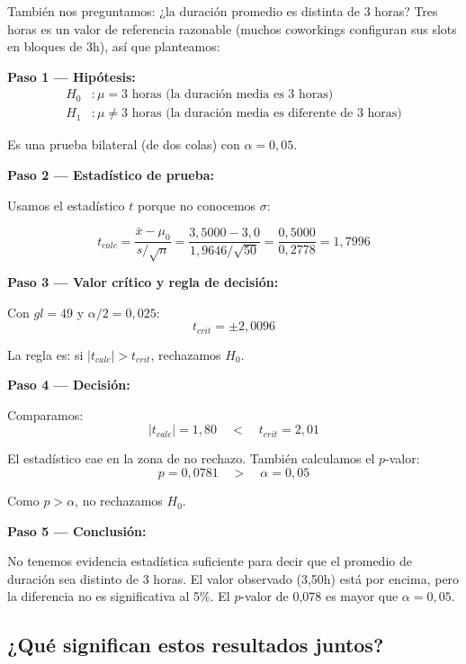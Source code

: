 \documentclass[12pt,a4paper]{article}
\begin{document}
También nos preguntamos: ¿la duración promedio es distinta de 3 horas? Tres horas es un valor de referencia razonable (muchos coworkings configuran sus slots en bloques de 3h), así que planteamos:

\vspace{6pt}
\textbf{Paso 1 — Hipótesis:}
\begin{align*}
H_0&: \mu = 3 \text{ horas (la duración media es 3 horas)} \\
H_1&: \mu \neq 3 \text{ horas (la duración media es diferente de 3 horas)}
\end{align*}

Es una prueba bilateral (de dos colas) con $\alpha = 0{,}05$.

\vspace{6pt}
\textbf{Paso 2 — Estadístico de prueba:}

Usamos el estadístico $t$ porque no conocemos $\sigma$:

\vspace{4pt}
$$t_{calc} = \frac{\bar{x} - \mu_0}{s / \sqrt{n}} = \frac{3{,}5000 - 3{,}0}{1{,}9646 / \sqrt{50}} = \frac{0{,}5000}{0{,}2778} = 1{,}7996$$

\vspace{6pt}
\textbf{Paso 3 — Valor crítico y regla de decisión:}

Con $gl = 49$ y $\alpha/2 = 0{,}025$:
$$t_{crit} = \pm 2{,}0096$$

La regla es: si $|t_{calc}| > t_{crit}$, rechazamos $H_0$.

\vspace{6pt}
\textbf{Paso 4 — Decisión:}

Comparamos:
$$|t_{calc}| = 1{,}80 \quad < \quad t_{crit} = 2{,}01$$

El estadístico cae en la zona de no rechazo. También calculamos el $p$-valor:
$$p = 0{,}0781 \quad > \quad \alpha = 0{,}05$$

Como $p > \alpha$, no rechazamos $H_0$.

\vspace{6pt}
\textbf{Paso 5 — Conclusión:}

No tenemos evidencia estadística suficiente para decir que el promedio de duración sea distinto de 3 horas. El valor observado (3,50h) está por encima, pero la diferencia no es significativa al 5\%. El $p$-valor de 0,078 es mayor que $\alpha = 0{,}05$.

\subsection{¿Qué significan estos resultados juntos?}
\end{document}
